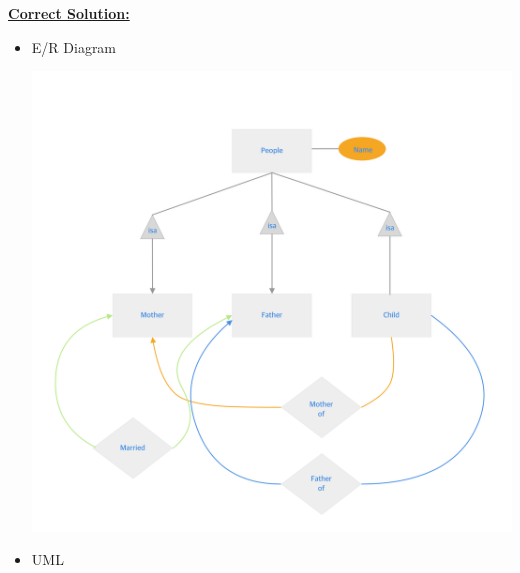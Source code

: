 \documentclass[12pt]{article}
\begin{document}
\begin{enumerate}[1.]
    \bigskip

    \begin{mdframed}
        \underline{\textbf{Correct Solution:}}

        \bigskip

        \begin{itemize}
            \item E/R Diagram

            \begin{center}
            \includegraphics[width=\linewidth]{images/worksheet_15_solution_15.png}
            \end{center}

            \item UML


\end{itemize}
\end{mdframed}
\end{enumerate}
\end{document}
